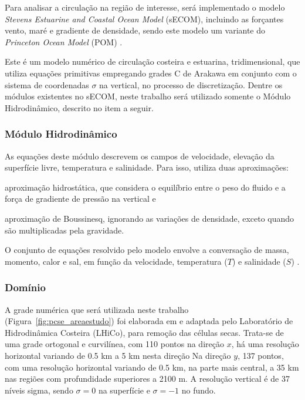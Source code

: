 
\hspace{6mm} Para analisar a circulação na região de interesse, será implementado o modelo \textit{Stevens 
Estuarine and Coastal Ocean Model} (sECOM), incluindo as forçantes vento, maré e gradiente de densidade, 
sendo este modelo um variante do \textit{Princeton Ocean Model} (POM) . 

\hspace{6mm} Este é um modelo numérico de circulação costeira e estuarina, tridimensional, que utiliza equações primitivas empregando
grades C de Arakawa em conjunto com o sistema de coordenadas $\sigma$ na vertical, no processo de discretização. 
Dentre os módulos existentes no sECOM, neste trabalho será utilizado somente o Módulo Hidrodinâmico, 
descrito no item a seguir.

\subsubsection{Módulo Hidrodinâmico}
\label{sub:moduloHidrodinamico}

\hspace{6mm} As equações deste módulo descrevem os campos de velocidade, elevação da superfície livre,
temperatura e salinidade. Para isso, utiliza duas aproximações: 
\begin{enumerate*}[label=(\alph*)]
  \item aproximação hidrostática, que considera o equilíbrio entre o peso do fluido e a força de gradiente de
  pressão na vertical e
  \item aproximação de Boussinesq, ignorando as variações de densidade, exceto quando são multiplicadas pela 
  gravidade.
\end{enumerate*}
O conjunto de equações resolvido pelo modelo envolve a conversação de massa, momento, calor e
sal, em função da velocidade, temperatura ($T$) e salinidade ($S$) . 

\subsubsection{Domínio}
\label{sub:dominio}

\hspace{6mm} A grade numérica que será utilizada neste trabalho (Figura~\ref{fig:pcse_areaestudo}) foi elaborada
em  e adaptada pelo Laboratório de Hidrodinâmica Costeira (LHiCo), para remoção
das células secas. Trata-se de uma grade ortogonal e curvilínea, com 110 pontos na direção $x$, há
uma resolução horizontal variando de 0.5 km a 5 km nesta direção Na direção $y$, 137 pontos,
com uma resolução horizontal variando de 0.5 km, na parte mais central, a 35 km nas regiões com profundidade
superiores a 2100 m. A resolução vertical é de 37 níveis sigma, sendo $\sigma = 0$ na superfície e $\sigma = -1$
no fundo.

